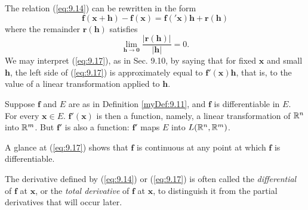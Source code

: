 \begin{myRemark}
    \begin{asparaenum}[(a)]
        \item The relation (\ref{eq:9.14}) can be rewritten in the form 
        \begin{equation}
            \label{eq:9.17}
            \mathbf{f(x + h)} - \mathbf{f(x)} = 
            \mathbf{f('x)h} + \mathbf{r(h)}
        \end{equation}
        where the remainder $\mathbf{r(h)}$ satisfies
        \begin{equation}
            \label{eq:9.18}
            \lim_{\mathbf{h} \to \mathbf{0}} 
            \frac{\left| \mathbf{r(h)} \right|}{\left| \mathbf{h} \right|} = 0.
        \end{equation}
        We may interpret (\ref{eq:9.17}), as in Sec. 9.10, by saying that for fixed $\mathbf{x}$ and small $\mathbf{h}$, 
        the left side of (\ref{eq:9.17}) is approximately equal to $\mathbf{f'(x)h}$, 
        that is, to the value of a linear transformation applied to $\mathbf{h}$.
        \item Suppose $\mathbf{f}$ and $E$ are as in Definition \ref{myDef:9.11}, and $\mathbf{f}$ is differentiable in $E$. 
        For every $\mathbf{x} \in E$. $\mathbf{f'(x)}$ is then a function, 
        namely, a linear transformation of ${\protect\mathbb R}^n$ into ${\protect\mathbb R}^m$. 
        But $\mathbf{f'}$ is also a function: 
        $\mathbf{f}'$ maps $E$ into $L({\protect\mathbb R}^n, {\protect\mathbb R}^m)$.
        \item A glance at (\ref{eq:9.17}) shows that $\mathbf{f}$ is continuous at any point at which $\mathbf{f}$ is differentiable.
        \item The derivative defined by (\ref{eq:9.14}) or (\ref{eq:9.17}) is often called 
        the \emph{differential} of $\mathbf{f}$ at $\mathbf{x}$, or the \emph{total derivative} of $\mathbf{f}$ at $\mathbf{x}$, 
        to distinguish it from the partial derivatives that will occur later.
    \end{asparaenum}
\end{myRemark}

